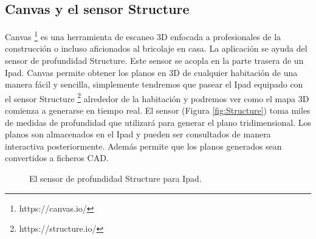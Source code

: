 \subsection{Canvas y el sensor Structure}
Canvas \footnote{https://canvas.io/ } es una herramienta de escaneo 3D enfocada a profesionales de la construcción o incluso aficionados al bricolaje en casa. La aplicación se ayuda del sensor de profundidad Structure. Este sensor se acopla en la parte trasera de un Ipad. Canvas permite obtener los planos en 3D de cualquier habitación de una manera fácil y sencilla, simplemente tendremos que pasear el Ipad equipado con el sensor Structure \footnote{https://structure.io/} alrededor de la habitación y podremos ver como el mapa 3D comienza a generarse en tiempo real. El sensor (Figura \ref{fig:Structure}) toma miles de medidas de profundidad que utilizará para generar el plano tridimensional. Los planos son almacenados en el Ipad y pueden ser consultados de manera interactiva posteriormente. Además permite que los planos generados sean convertidos a ficheros CAD.



\begin{figure}[htbp]
\begin{center}
\end{center}
\caption{El sensor de profundidad Structure para Ipad. }
\end{figure}


